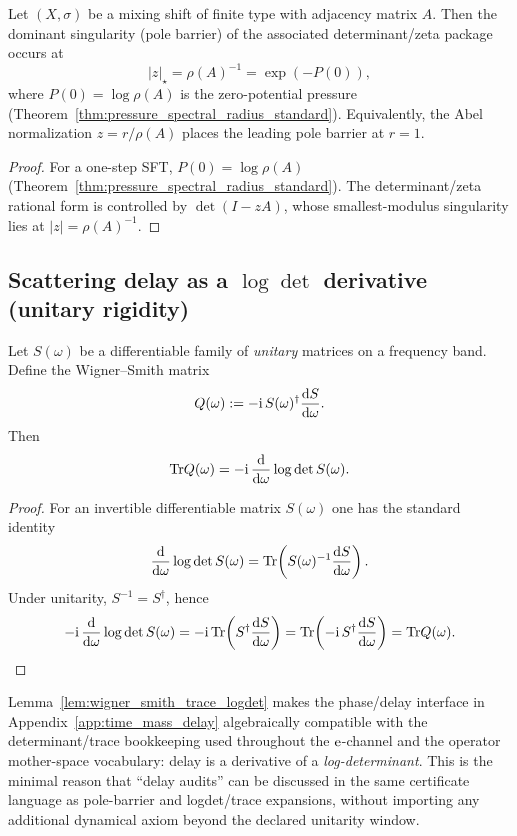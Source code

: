 \begin{corollary}\label{cor:pole_barrier_equals_exp_minus_pressure}
\MathTag Let $(X,\sigma)$ be a mixing shift of finite type with adjacency matrix $A$.
Then the dominant singularity (pole barrier) of the associated determinant/zeta package occurs at
\[
|z|_\star=\rho(A)^{-1}=\exp(-P(0)),
\]
where $P(0)=\log\rho(A)$ is the zero-potential pressure (Theorem~\ref{thm:pressure_spectral_radius_standard}).
Equivalently, the Abel normalization $z=r/\rho(A)$ places the leading pole barrier at $r=1$.
\end{corollary}
\begin{proof}
For a one-step SFT, $P(0)=\log\rho(A)$ (Theorem~\ref{thm:pressure_spectral_radius_standard}).
The determinant/zeta rational form is controlled by $\det(I-zA)$, whose smallest-modulus singularity lies at $|z|=\rho(A)^{-1}$.
\end{proof}

\subsection{Scattering delay as a \texorpdfstring{$\log\det$}{logdet} derivative (unitary rigidity)}
\label{subsec:rigidity_scattering_delay_logdet}

\begin{lemma}\label{lem:wigner_smith_trace_logdet}
\MathTag Let $S(\omega)$ be a differentiable family of \emph{unitary} matrices on a frequency band.
Define the Wigner--Smith matrix
\[
Q(\omega):=-\mathrm{i}\,S(\omega)^\dagger\frac{\mathrm{d} S}{\mathrm{d} \omega}.
\]
Then
\[
\mathrm{Tr} Q(\omega)=-\mathrm{i}\,\frac{\mathrm{d}}{\mathrm{d}\omega}\log\det S(\omega).
\]
\end{lemma}
\begin{proof}
For an invertible differentiable matrix $S(\omega)$ one has the standard identity
\[
\frac{\mathrm{d}}{\mathrm{d}\omega}\log\det S(\omega)=\mathrm{Tr}\!\left(S(\omega)^{-1}\frac{\mathrm{d} S}{\mathrm{d}\omega}\right).
\]
Under unitarity, $S^{-1}=S^\dagger$, hence
\[
-\mathrm{i}\,\frac{\mathrm{d}}{\mathrm{d}\omega}\log\det S(\omega)
=-\mathrm{i}\,\mathrm{Tr}\!\left(S^\dagger\frac{\mathrm{d} S}{\mathrm{d}\omega}\right)
=\mathrm{Tr}\!\left(-\mathrm{i}\,S^\dagger\frac{\mathrm{d} S}{\mathrm{d}\omega}\right)
=\mathrm{Tr} Q(\omega).
\]
\end{proof}

\begin{remark}\label{rem:rigidity_ws_logdet_bridge}
\AuditTag Lemma~\ref{lem:wigner_smith_trace_logdet} makes the phase/delay interface in Appendix~\ref{app:time_mass_delay} algebraically compatible with the determinant/trace bookkeeping used throughout the $\mathrm{e}$-channel and the operator mother-space vocabulary:
delay is a derivative of a \emph{log-determinant}.
This is the minimal reason that ``delay audits'' can be discussed in the same certificate language as pole-barrier and logdet/trace expansions, without importing any additional dynamical axiom beyond the declared unitarity window.
\end{remark}

